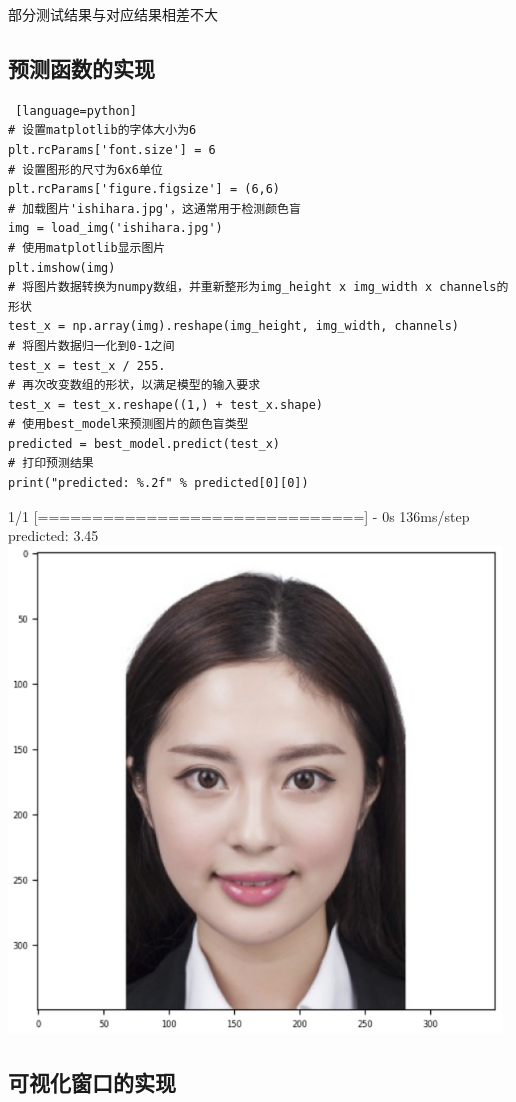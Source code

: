\documentclass{article}
\begin{document}
部分测试结果与对应结果相差不大
\subsection{预测函数的实现}
\begin{lstlisting} [language=python]
# 设置matplotlib的字体大小为6  
plt.rcParams['font.size'] = 6  
# 设置图形的尺寸为6x6单位  
plt.rcParams['figure.figsize'] = (6,6)  
# 加载图片'ishihara.jpg'，这通常用于检测颜色盲  
img = load_img('ishihara.jpg')  
# 使用matplotlib显示图片  
plt.imshow(img)  
# 将图片数据转换为numpy数组，并重新整形为img_height x img_width x channels的形状   
test_x = np.array(img).reshape(img_height, img_width, channels)  
# 将图片数据归一化到0-1之间  
test_x = test_x / 255.  
# 再次改变数组的形状，以满足模型的输入要求  
test_x = test_x.reshape((1,) + test_x.shape)  
# 使用best_model来预测图片的颜色盲类型  
predicted = best_model.predict(test_x)  
# 打印预测结果  
print("predicted: %.2f" % predicted[0][0])
\end{lstlisting}
1/1 [==============================] - 0s 136ms/step\\
predicted: 3.45\\
\includegraphics[width=0.98\textwidth]{9.png}


\subsection{可视化窗口的实现}
\end{document}

